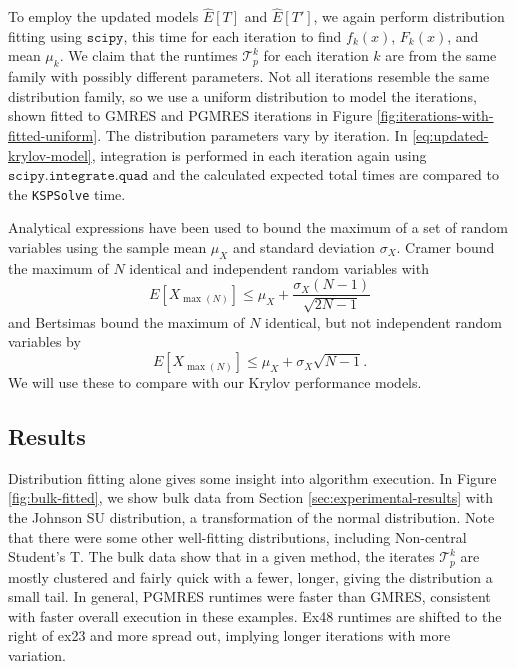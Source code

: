 \documentclass[sigconf]{acmart}
\begin{document}
To employ the updated models $\widehat{E}[T]$ and $\widehat{E}[T']$, we again perform distribution fitting using ${\texttt{scipy}}$, this time for each iteration to find  $f_k(x)$, $F_k(x)$, and mean $\mu_k$.
We claim that the runtimes $\mathcal{T}^k_p$ for each iteration $k$ are from the same family with possibly different parameters. 
Not all iterations resemble the same distribution family, so we use a uniform distribution to model the iterations, shown fitted to GMRES and PGMRES iterations in Figure \ref{fig:iterations-with-fitted-uniform}. 
The distribution parameters vary by iteration.
In \eqref{eq:updated-krylov-model}, integration is performed in each iteration again using ${\texttt{scipy.integrate.quad}}$ and the calculated expected total times are compared to the \texttt{KSPSolve} time.

Analytical expressions have been used \cite{seelam2010extreme} to bound the maximum of a set of random variables using the sample mean $\mu_X$ and standard deviation $\sigma_X$.  Cramer \cite{cramer2016mathematical, david2004order} bound the maximum of $N$ identical and independent random variables  with
\begin{equation}
E[X_{\max{(N)}}] \leq \mu_X + \frac{\sigma_X (N-1)}{\sqrt{2N-1}}
\end{equation}
and Bertsimas \cite{bertsimas2006tight} bound the maximum of $N$ identical, but not independent random variables by
\begin{equation}
E[X_{\max{(N)}}] \leq \mu_X + \sigma_X \sqrt{N-1}.
\end{equation}
We will use these to compare with our Krylov performance models.

\subsection{Results}

Distribution fitting alone gives some insight into algorithm execution. 
In Figure \ref{fig:bulk-fitted}, we show bulk data from Section \ref{sec:experimental-results} with the Johnson SU distribution, a transformation of the normal distribution. Note that there were some other well-fitting distributions, including Non-central Student's T.
The bulk data show that in a given method, the iterates $\mathcal{T}^k_p$ are mostly clustered and fairly quick with a fewer, longer, giving the distribution a small tail.
In general, PGMRES runtimes were faster than GMRES, consistent with faster overall execution in these examples. Ex48 runtimes are shifted to the right of ex23 and more spread out, implying longer iterations with more variation. 
\end{document}
